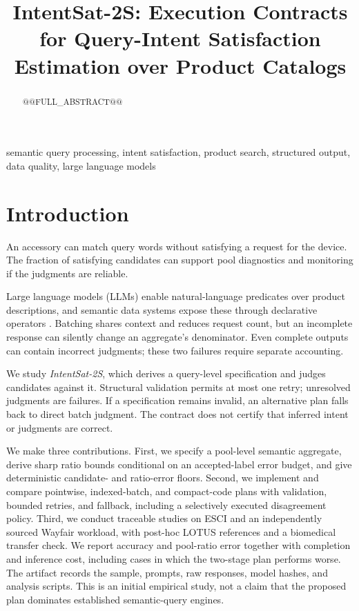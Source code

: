 \documentclass[conference]{IEEEtran}
\begin{document}
\title{IntentSat-2S: Execution Contracts for Query-Intent Satisfaction Estimation over Product Catalogs}
\author{}
\maketitle
\begin{abstract}
@@FULL_ABSTRACT@@
\end{abstract}
\begin{IEEEkeywords}
semantic query processing, intent satisfaction, product search, structured output, data quality, large language models
\end{IEEEkeywords}

\section{Introduction}
An accessory can match query words without satisfying a request for the device. The fraction of satisfying candidates can support pool diagnostics and monitoring if the judgments are reliable.

Large language models (LLMs) enable natural-language predicates over product descriptions, and semantic data systems expose these through declarative operators \cite{lotus,docetl,palimpzest}. Batching shares context and reduces request count, but an incomplete response can silently change an aggregate's denominator. Even complete outputs can contain incorrect judgments; these two failures require separate accounting.

We study \emph{IntentSat-2S}, which derives a query-level specification and judges candidates against it. Structural validation permits at most one retry; unresolved judgments are failures. If a specification remains invalid, an alternative plan falls back to direct batch judgment. The contract does not certify that inferred intent or judgments are correct.

We make three contributions. First, we specify a pool-level semantic aggregate, derive sharp ratio bounds conditional on an accepted-label error budget, and give deterministic candidate- and ratio-error floors. Second, we implement and compare pointwise, indexed-batch, and compact-code plans with validation, bounded retries, and fallback, including a selectively executed disagreement policy. Third, we conduct traceable studies on ESCI and an independently sourced Wayfair workload, with post-hoc LOTUS references and a biomedical transfer check. We report accuracy and pool-ratio error together with completion and inference cost, including cases in which the two-stage plan performs worse. The artifact records the sample, prompts, raw responses, model hashes, and analysis scripts. This is an initial empirical study, not a claim that the proposed plan dominates established semantic-query engines.
\end{document}
